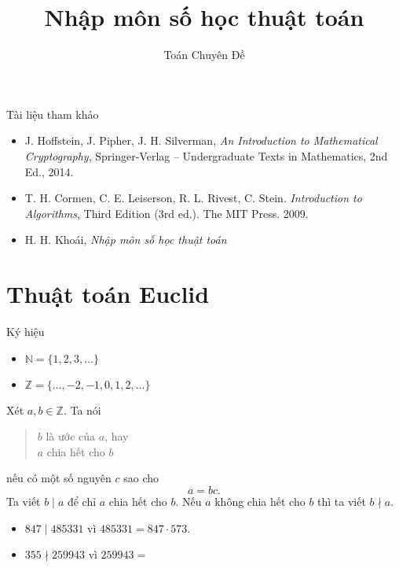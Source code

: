 
\title{Nhập môn số học thuật toán} 
 \author{Toán Chuyên Đề}     
    
\maketitle    

\begin{frame}{Tài liệu tham khảo}
  \begin{itemize}
  \item J. Hoffstein, J. Pipher, J. H. Silverman,
    \textit{An Introduction to Mathematical Cryptography},
    Springer-Verlag – Undergraduate Texts in Mathematics, 2nd Ed.,
    2014.
  \item T. H. Cormen, C. E. Leiserson, R. L. Rivest, C. Stein.  \textit{Introduction to Algorithms}, Third Edition (3rd ed.). The MIT Press. 2009.

  \item H. H. Khoái, \textit{Nhập môn số học thuật toán}
  \end{itemize}
\end{frame}

\section{Thuật toán Euclid}
\begin{frame}{Ký hiệu}
	\begin{itemize}
		\item $\mathbb{N} = \{1,2,3, \dots\}$
		\item $\mathbb{Z} = \{\dots,-2,-1,0,1, 2, \dots\}$
	\end{itemize}
\end{frame}

\begin{frame}%
  \begin{dfntn}
    Xét $a,b \in \mathbb{Z}$. Ta nói 
    \begin{quotation}
      $b$ là ước của $a$, hay \\
      $a$ chia hết cho $b$
    \end{quotation}
nếu có một số nguyên $c$ sao cho $$a = bc.$$
Ta viết  $b\mid a $ để chỉ $a$ chia hết cho $b$. Nếu $a$ không chia hết cho $b$ thì ta viết $b \nmid a$.
  \end{dfntn}
\pause 
  \begin{xmpl}
    \begin{itemize}
    \item $847 \mid 485331$ vì $485331 = 847 \cdot 573$.
    \item $355 \nmid 259943$ vì $259943 = $ 
    \end{itemize}
  \end{xmpl}
\end{frame}

